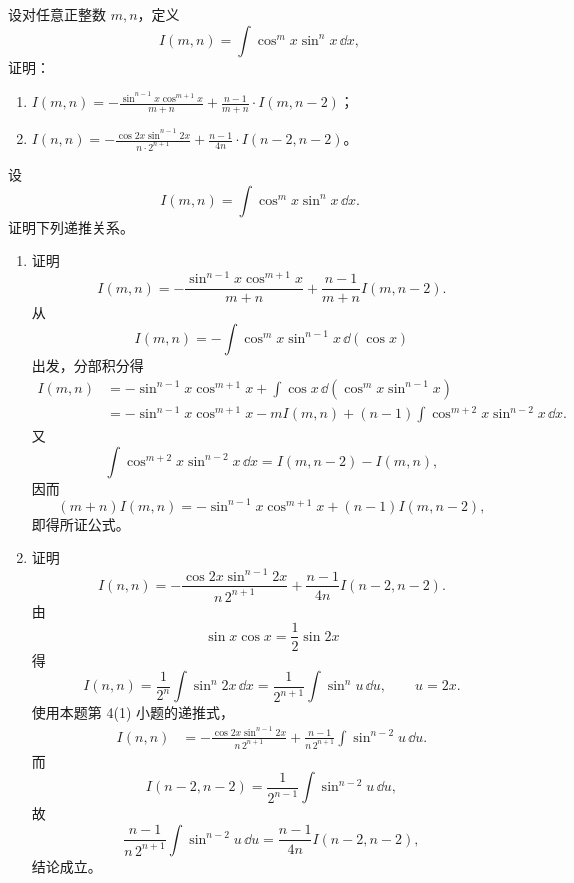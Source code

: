 \begin{xexercise}[6]
设对任意正整数 $m,n$，定义
  \[
    I(m,n)=\int\cos^mx\sin^nx\,\dd x,
  \]
  证明：
  \begin{enumerate}[label=(\arabic*)]
    \item $\displaystyle I(m,n)=-\frac{\sin^{n-1}x\cos^{m+1}x}{m+n}+\frac{n-1}{m+n}\cdot I(m,n-2)$；
    \item $\displaystyle I(n,n)=-\frac{\cos2x\sin^{n-1}2x}{n\cdot2^{n+1}}+\frac{n-1}{4n}\cdot I(n-2,n-2)$。
  \end{enumerate}
\end{xexercise}
\begin{xsolution}
设
  \[
    I(m,n)=\int\cos^mx\sin^nx\,\dd x.
  \]
  证明下列递推关系。
  \begin{enumerate}[label=(\arabic*)]
    \item 证明
    \[
      I(m,n)=-\frac{\sin^{n-1}x\cos^{m+1}x}{m+n}
      +\frac{n-1}{m+n}I(m,n-2).
    \]
    从
    \[
      I(m,n)=-\int\cos^mx\sin^{n-1}x\,\dd(\cos x)
    \]
    出发，分部积分得
    \begin{align*}
      I(m,n)
      &=-\sin^{n-1}x\cos^{m+1}x
       +\int\cos x\,\dd(\cos^mx\sin^{n-1}x)\\
      &=-\sin^{n-1}x\cos^{m+1}x
       -mI(m,n)
       +(n-1)\int\cos^{m+2}x\sin^{n-2}x\,\dd x.
    \end{align*}
    又
    \[
      \int\cos^{m+2}x\sin^{n-2}x\,\dd x
      =I(m,n-2)-I(m,n),
    \]
    因而
    \[
      (m+n)I(m,n)
      =-\sin^{n-1}x\cos^{m+1}x+(n-1)I(m,n-2),
    \]
    即得所证公式。

    \item 证明
    \[
      I(n,n)=-\frac{\cos2x\sin^{n-1}2x}{n\,2^{n+1}}
      +\frac{n-1}{4n}I(n-2,n-2).
    \]
    由
    \[
      \sin x\cos x=\frac12\sin2x
    \]
    得
    \[
      I(n,n)=\frac1{2^n}\int\sin^n2x\,\dd x
      =\frac1{2^{n+1}}\int\sin^nu\,\dd u,
      \qquad u=2x.
    \]
    使用本题第 4(1) 小题的递推式，
    \begin{align*}
      I(n,n)
      &=-\frac{\cos2x\sin^{n-1}2x}{n\,2^{n+1}}
       +\frac{n-1}{n\,2^{n+1}}\int\sin^{n-2}u\,\dd u.
    \end{align*}
    而
    \[
      I(n-2,n-2)=\frac1{2^{n-1}}\int\sin^{n-2}u\,\dd u,
    \]
    故
    \[
      \frac{n-1}{n\,2^{n+1}}\int\sin^{n-2}u\,\dd u
      =\frac{n-1}{4n}I(n-2,n-2),
    \]
    结论成立。
  \end{enumerate}
\end{xsolution}


